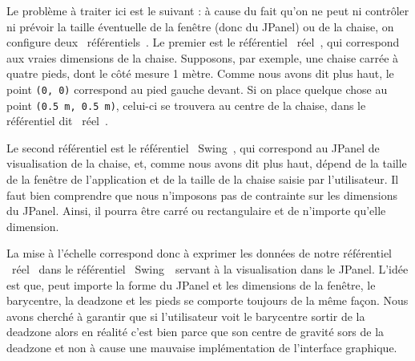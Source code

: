 \documentclass{polytech/polytech}
\begin{document}
Le problème à traiter ici est le suivant : à cause du fait qu'on ne peut ni contrôler ni prévoir la taille éventuelle de la fenêtre (donc du JPanel) ou de la chaise, on configure deux \guillemotleft ~référentiels~\guillemotright . 
Le premier est le référentiel \guillemotleft ~réel~\guillemotright , qui correspond aux vraies dimensions de la chaise.
Supposons, par exemple, une chaise carrée à quatre pieds, dont le côté mesure 1 mètre.
Comme nous avons dit plus haut, le point \texttt{(0, 0)} correspond au pied gauche devant.
Si on place quelque chose au point \texttt{(0.5 m, 0.5 m)}, celui-ci se trouvera au centre de la chaise, dans le référentiel dit \guillemotleft ~réel~\guillemotright . 

Le second référentiel est le référentiel \guillemotleft ~Swing~\guillemotright , qui correspond au JPanel de visualisation de la chaise, et, comme nous avons dit plus haut, dépend de la taille de la fenêtre de l'application et de la taille de la chaise saisie par l'utilisateur. 
Il faut bien comprendre que nous n'imposons pas de contrainte sur les dimensions du JPanel. Ainsi, il pourra être carré ou rectangulaire et de n'importe qu'elle dimension.


La mise à l'échelle correspond donc à exprimer les données de notre référentiel \guillemotleft ~réel \guillemotright\ dans le référentiel \guillemotleft\ Swing~\guillemotright\  servant à la visualisation dans le JPanel. 
L'idée est que, peut importe la forme du JPanel et les dimensions de la fenêtre, le barycentre, la deadzone et les pieds se comporte toujours de la même façon.
 Nous avons cherché à garantir que si l'utilisateur voit le barycentre sortir de la deadzone alors en réalité c'est bien parce que son centre de gravité sors de la deadzone et non à cause une mauvaise implémentation de l'interface graphique.
 
\end{document}
